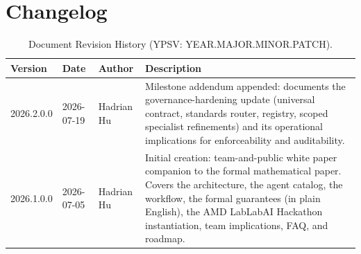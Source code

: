\documentclass[12pt]{article}
\begin{document}
\newpage
\section*{Changelog}
\label{sec:changelog}

\begin{table}[H]
\centering
\caption{Document Revision History (YPSV: YEAR.MAJOR.MINOR.PATCH).}
\begin{tabular}{@{}lllp{7.0cm}@{}}
\toprule
\textbf{Version} & \textbf{Date} & \textbf{Author} & \textbf{Description} \\
\midrule
2026.2.0.0 & 2026-07-19 & Hadrian Hu & Milestone addendum appended:
documents the governance-hardening update (universal contract,
standards router, registry, scoped specialist refinements) and its
operational implications for enforceability and auditability. \\
2026.1.0.0 & 2026-07-05 & Hadrian Hu &
  Initial creation: team-and-public white paper companion to the
  formal mathematical paper.
  Covers the architecture, the agent catalog, the workflow, the
  formal guarantees (in plain English), the AMD LabLabAI Hackathon
  instantiation, team implications, FAQ, and roadmap. \\
\bottomrule
\end{tabular}
\end{table}
\end{document}
